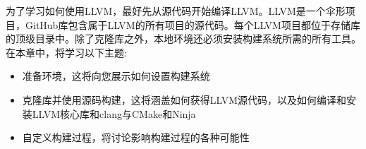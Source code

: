 为了学习如何使用LLVM，最好先从源代码开始编译LLVM。LLVM是一个伞形项目，GitHub库包含属于LLVM的所有项目的源代码。每个LLVM项目都位于存储库的顶级目录中。除了克隆库之外，本地环境还必须安装构建系统所需的所有工具。在本章中，将学习以下主题:

\begin{itemize}
\item
准备环境，这将向您展示如何设置构建系统

\item
克隆库并使用源码构建，这将涵盖如何获得LLVM源代码，以及如何编译和安装LLVM核心库和clang与CMake和Ninja

\item
自定义构建过程，将讨论影响构建过程的各种可能性
\end{itemize}








